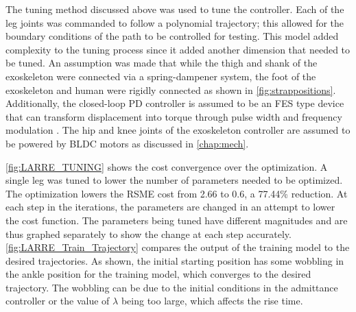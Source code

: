 The tuning method discussed above was used to tune the controller. Each of the leg joints was commanded to follow a polynomial trajectory; this allowed for the boundary conditions of the path to be controlled for testing. This model added complexity to the tuning process since it added another dimension that needed to be tuned. An assumption was made that while the thigh and shank of the exoskeleton were connected via a spring-dampener system, the foot of the exoskeleton and human were rigidly connected as shown in \autoref{fig:strappositions}. Additionally, the closed-loop PD controller is assumed to be an FES type device that can transform displacement into torque through pulse width and frequency modulation \cite{rouhani2017pid, ha2015approach,Model_Ferrarin}. The hip and knee joints of the exoskeleton controller are assumed to be powered by BLDC motors as discussed in \autoref{chap:mech}.

\autoref{fig:LARRE_TUNING} shows the cost convergence over the optimization. A single leg was tuned to lower the number of parameters needed to be optimized. The optimization lowers the RSME cost from 2.66 to 0.6, a 77.44\% reduction. At each step in the iterations, the parameters are changed in an attempt to lower the cost function. The parameters being tuned have different magnitudes and are thus graphed separately to show the change at each step accurately. \autoref{fig:LARRE_Train_Trajectory} compares the output of the training model to the desired trajectories. As shown, the initial starting position has some wobbling in the ankle position for the training model, which converges to the desired trajectory. The wobbling can be due to the initial conditions in the admittance controller or the value of $\lambda$ being too large, which affects the rise time.  

